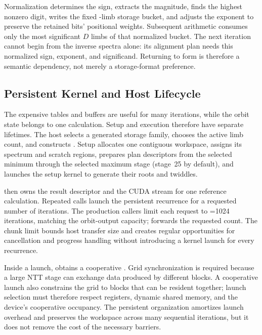 Normalization determines the sign, extracts the magnitude, finds the highest
nonzero digit, writes the fixed -limb storage bucket, and
adjusts the exponent to preserve the retained bits' positional weights.
Subsequent arithmetic consumes only the most significant $D$ limbs of that
normalized bucket.  The next
iteration cannot begin from the inverse spectra alone: its alignment plan needs
this normalized sign, exponent, and significand.  Returning to
 form is therefore a semantic dependency, not merely a
storage-format preference.

\subsection{Persistent Kernel and Host Lifecycle}
\label{subsec:ref-orbit-architecture}

The expensive tables and buffers are useful for many iterations, while the
orbit state belongs to one calculation.  Setup and execution therefore have
separate lifetimes.  The host selects a generated
storage family, chooses the active limb count, and constructs
.  Setup allocates one contiguous workspace,
assigns its spectrum and scratch regions, prepares plan descriptors from the
selected minimum through the selected maximum stage (stage~25 by default),
and launches the setup kernel to
generate their roots and twiddles.

 then owns the result descriptor and the CUDA stream for
one reference calculation.  Repeated  calls launch the
persistent recurrence for a requested number of iterations.  The production
callers limit each request to =1024 iterations, matching
the orbit-output capacity;  forwards the requested count.
The chunk limit bounds host transfer size and creates regular opportunities for cancellation and progress
handling without introducing a kernel launch for every recurrence.

Inside a launch,  obtains a cooperative
.  Grid synchronization is required because a large NTT stage
can exchange data produced by different blocks.  A cooperative launch also
constrains the grid to blocks that can be resident together; launch selection
must therefore respect registers, dynamic shared memory, and the device's
cooperative occupancy.  The persistent organization amortizes launch overhead
and preserves the workspace across many sequential iterations, but it does not
remove the cost of the necessary barriers.

